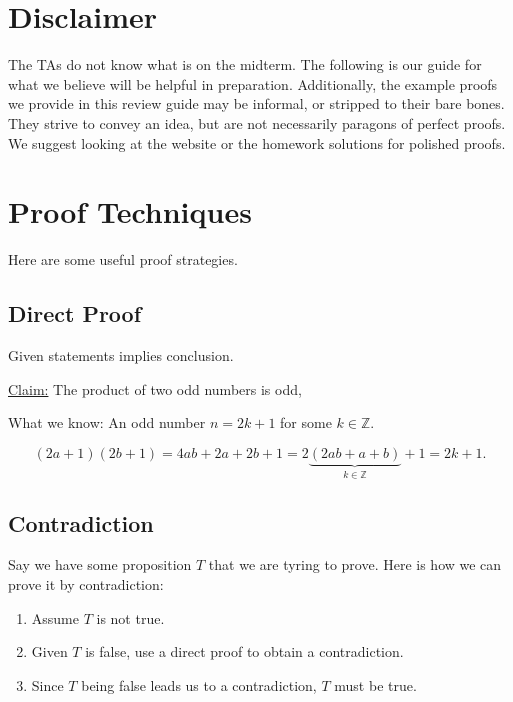 \documentclass[12pt,letterpaper]{article}
\newcommand{\claim}{\underline{Claim:} }
\newcommand\Z{\mathbb Z}
\begin{document}
\section{Disclaimer}

The TAs do not know what is on the midterm. The following is our guide for what we believe will be helpful in preparation. Additionally, the example proofs we provide in this review guide may be informal, or stripped to their bare bones. They strive to convey an idea, but are not necessarily paragons of perfect proofs. We suggest looking at the website or the homework solutions for polished proofs.

\section{Proof Techniques}

Here are some useful proof strategies.

    \subsection{Direct Proof}
    
    Given statements implies conclusion.
    
    \begin{mdframed}
    \claim The product of two odd numbers is odd,
    
    What we know:
    An odd number $n = 2k + 1$ for some $k \in \Z$.
    
    \[
    (2a+1)(2b+1) = 4ab + 2a + 2b + 1 = 2\underbrace{(2ab + a + b)}_{k \in \Z} + 1 = 2k+1.
    \]
    \end{mdframed}
    
    \subsection{Contradiction}
    
    Say we have some proposition $T$ that we are tyring to prove. Here is how we can  prove it by contradiction:
      \begin{enumerate}
        \item Assume $T$ is not true.
        \item Given $T$ is false, use a direct proof to obtain a contradiction.
        \item Since $T$ being false leads us to a contradiction, $T$ must be true.
      \end{enumerate}
      
\end{document}
